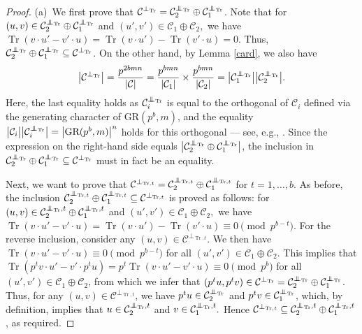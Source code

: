 \documentclass{article}
\DeclareMathOperator{\Tr}{Tr}
\newcommand\independent{\protect\mathpalette{\protect\independenT}{\perp}}
\def\independenT#1#2{\mathrel{\rlap{$#1#2$}\mkern3mu{#1#2}}}
\theoremstyle{remark}
\theoremstyle{definition}
\numberwithin{equation}{section}
\begin{document}
\begin{proof}
(a)\ We first prove that $\mathcal{C}^{\perp_{\Tr}}= \mathcal{C}_2^{\independent_{\Tr}} \oplus \mathcal{C}_1^{\independent_{\Tr}}$. Note that for $(u,v) \in  \mathcal{C}_2^{\independent_{\Tr}} \oplus \mathcal{C}_1^{\independent_{\Tr}}$ and $(u',v') \in \mathcal{C}_1 \oplus \mathcal{C}_2,$ we have $\Tr(v \cdot u'-v' \cdot u)=\Tr(v \cdot u')-\Tr(v' \cdot u)=0.$ Thus, $\mathcal{C}_2^{\independent_{\Tr}} \oplus \mathcal{C}_1^{\independent_{\Tr}} \subseteq \mathcal{C}^{\perp_{\Tr}}$. On the other hand, by Lemma \ref{card}, we also have
\begin{equation*}
\bigl|\mathcal{C}^{\perp_{\Tr}}\bigr|=\frac{p^{2bmn}}{|\mathcal{C}|}=\frac{p^{bmn}}{|\mathcal{C}_1|} \times\frac{p^{bmn}}{|\mathcal{C}_2|}= \bigl|\mathcal{C}_1^{\independent_{\Tr}}\bigr|\bigl|\mathcal{C}_2^{\independent_{\Tr}}\bigr|.\end{equation*} Here, the last equality holds as $\mathcal{C}_i^{\independent_{\Tr}}$ is equal to the orthogonal of $\mathcal{C}_i$ defined via the generating character of $\text{GR}(p^b,m)$, and the equality $\bigl|\mathcal{C}_i\bigr| \bigl|\mathcal{C}_i^{\independent_{\Tr}}\bigr| = {\bigl| \text{GR}(p^b,m) \bigr|}^n$ holds for this orthogonal --- see, e.g., \cite[Chapter 3]{dougherty17}.
Since the expression on the right-hand side equals $\bigl| \mathcal{C}_2^{\independent_{\Tr}} \oplus \mathcal{C}_1^{\independent_{\Tr}} \bigr|$, the inclusion in $\mathcal{C}_2^{\independent_{\Tr}} \oplus \mathcal{C}_1^{\independent_{\Tr}} \subseteq \mathcal{C}^{\perp_{\Tr}}$ must in fact be an equality.

Next, we want to prove that $\mathcal{C}^{\perp_{\Tr,t}} = \mathcal{C}_2^{\independent_{\Tr,t}} \oplus \mathcal{C}_1^{\independent_{\Tr,t}}$ for $t = 1,\ldots,b$. As before, the inclusion $\mathcal{C}_2^{\independent_{\Tr,t}} \oplus \mathcal{C}_1^{\independent_{\Tr,t}} \subseteq \mathcal{C}^{\perp_{\Tr,t}}$ is proved as follows: for $(u,v) \in  \mathcal{C}_2^{\independent_{\Tr},t} \oplus \mathcal{C}_1^{\independent_{\Tr},t}$ and   $(u',v') \in \mathcal{C}_1 \oplus \mathcal{C}_2,$ we have $\Tr(v \cdot u'-v' \cdot u)=\Tr(v \cdot u')-\Tr(v' \cdot u)\equiv 0 \!\!  \pmod{p^{b-t}}$. For the reverse inclusion, consider any $(u,v) \in \mathcal{C}^{\perp_{\Tr,t}}$. We then have $\Tr(v \cdot u'-v' \cdot u)\equiv 0 \!\! \pmod{p^{b-t}}$ for all $(u',v') \in \mathcal{C}_1 \oplus \mathcal{C}_2.$ This implies that $\Tr(p^{t}v \cdot u'-v' \cdot p^t u) = p^t \Tr(v \cdot u'-v' \cdot u) \equiv 0 \!\! \pmod{p^{b}}$ for all  $(u',v') \in \mathcal{C}_1 \oplus \mathcal{C}_2$, from which we infer that $(p^t u,p^t v) \in \mathcal{C}^{\perp_{\Tr}} =  \mathcal{C}_2^{\independent_{\Tr}} \oplus \mathcal{C}_1^{\independent_{\Tr}}$. Thus, for any $(u,v) \in\mathcal{C}^{\perp_{\Tr,t}}$, we have $p^t u \in \mathcal{C}_2^{\independent_{\Tr}}$ and  $p^t v \in\mathcal{C}_1^{\independent_{\Tr}}$, which, by definition, implies that $u \in \mathcal{C}_2^{\independent_{\Tr},t}$ and $ v \in\mathcal{C}_1^{\independent_{\Tr},t}.$ Hence $\mathcal{C}^{\perp_{\Tr,t}} \subseteq \mathcal{C}_2^{\independent_{\Tr},t} \oplus \mathcal{C}_1^{\independent_{\Tr},t}$, as required. 


\end{proof}
\end{document}
